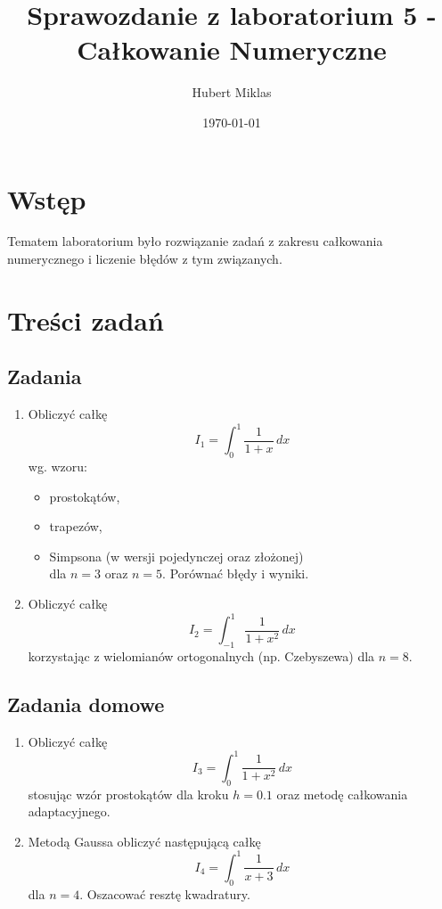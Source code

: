 \documentclass[a4paper,12pt]{article}
\title{Sprawozdanie z laboratorium 5 - Całkowanie Numeryczne}
\author{Hubert Miklas}
\date{\today}
\begin{document}
\maketitle

\section{Wstęp}
Tematem laboratorium było rozwiązanie zadań z zakresu całkowania numerycznego i liczenie błędów z tym związanych.

\section{Treści zadań}
\subsection*{Zadania}
\begin{enumerate}
    \item Obliczyć całkę
    \[
    I_1=\int_{0}^{1}\frac{1}{1+x}\,dx
    \]
    wg. wzoru:
    \begin{itemize}
        \item prostokątów,
        \item trapezów,
        \item Simpsona (w wersji pojedynczej oraz złożonej)\\[1mm]
        dla \(n=3\) oraz \(n=5\). Porównać błędy i wyniki.
    \end{itemize}
    
    \item Obliczyć całkę
    \[
    I_2=\int_{-1}^{1}\frac{1}{1+x^2}\,dx
    \]
    korzystając z wielomianów ortogonalnych (np. Czebyszewa) dla \(n=8\).
\end{enumerate}

\subsection*{Zadania domowe}
\begin{enumerate}
    \item Obliczyć całkę
    \[
    I_3=\int_{0}^{1}\frac{1}{1+x^2}\,dx
    \]
    stosując wzór prostokątów dla kroku \(h=0.1\) oraz metodę całkowania adaptacyjnego.
    
    \item Metodą Gaussa obliczyć następującą całkę
    \[
    I_4=\int_{0}^{1}\frac{1}{x+3}\,dx
    \]
    dla \(n=4\). Oszacować resztę kwadratury.
\end{enumerate}
\end{document}
